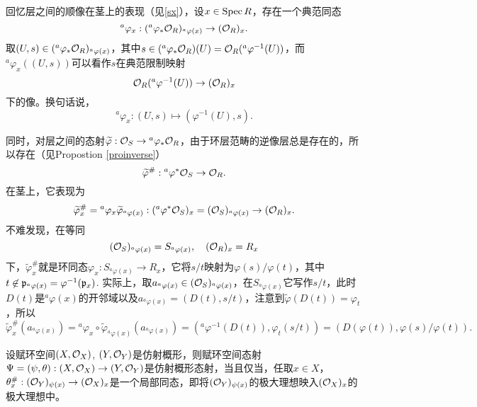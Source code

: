 \begin{para}
回忆层之间的顺像在茎上的表现（见\ref{sx}），设$x\in \operatorname{Spec} R$，存在一个典范同态
\[
	{}^a\varphi_x:({}^a\varphi_*\mathcal{O}_R)_{{}^a\varphi(x)}\to (\mathcal{O}_R)_{x}.
\]
取$(U,s)\in ({}^a\varphi_*\mathcal{O}_R)_{{}^a\varphi(x)}$，其中$s\in ({}^a\varphi_*\mathcal{O}_R)(U)=\mathcal{O}_R({}^a\varphi^{-1}(U))$，而${}^a\varphi_x((U,s))$可以看作$s$在典范限制映射
\[
	\mathcal{O}_R({}^a\varphi^{-1}(U))\to (\mathcal{O}_R)_x
\]
下的像。换句话说，
\[
	{}^a\varphi_x:(U,s)\mapsto (\varphi^{-1}(U),s).
\]

同时，对层之间的态射$\widetilde{\varphi}:\mathcal{O}_S\to {}^a\varphi_*\mathcal{O}_R$，由于环层范畴的逆像层总是存在的，所以存在（见Propostion \ref{proinverse}）
\[
	\widetilde{\varphi}^\#:{}^a\varphi^*\mathcal{O}_S\to \mathcal{O}_R.
\]
在茎上，它表现为
\[
	\widetilde{\varphi}^\#_x={}^a\varphi_x \widetilde{\varphi}_{{}^a\varphi(x)}:({}^a\varphi^*\mathcal{O}_S)_x=(\mathcal{O}_S)_{{}^a\varphi(x)}\to (\mathcal{O}_R)_x.
\]
不难发现，在等同
\[
	(\mathcal{O}_S)_{{}^a\varphi(x)}=S_{{}^a\varphi(x)},\quad (\mathcal{O}_R)_x=R_x
\]
下，$\widetilde{\varphi}^\#_x$就是环同态$\varphi_x:S_{{}^a\varphi(x)}\to R_x$，它将$s/t$映射为$\varphi(s)/\varphi(t)$，其中$t\not\in \mathfrak{p}_{{}^a\varphi(x)}=\varphi^{-1}(\mathfrak{p}_x)$. 实际上，取$a_{{}^a\varphi(x)}\in (\mathcal{O}_S)_{{}^a\varphi(x)}$，在$S_{{}^a\varphi(x)}$它写作$s/t$，此时$D(t)$是${}^a\varphi(x)$的开邻域以及$a_{{}^a\varphi(x)}=(D(t),s/t)$，注意到$\widetilde{\varphi}(D(t))=\varphi_t$，所以
\[
	\widetilde{\varphi}^\#_x(a_{{}^a\varphi(x)})={}^a\varphi_x \circ \widetilde{\varphi}_{{}^a\varphi(x)}(a_{{}^a\varphi(x)})=({}^a\varphi^{-1}(D(t)),\varphi_t(s/t))=(D(\varphi(t)),\varphi(s)/\varphi(t)).
\]
\end{para}

\begin{pro}
设赋环空间$(X,\mathcal{O}_X)$, $(Y,\mathcal{O}_Y)$是仿射概形，则赋环空间态射$\Psi=(\psi,\theta):(X,\mathcal{O}_X)\to (Y,\mathcal{O}_Y)$是仿射概形态射，当且仅当，任取$x\in X$，$\theta_x^\#:(\mathcal{O}_Y)_{\psi(x)}\to (\mathcal{O}_X)_x$是一个局部同态，即将$(\mathcal{O}_Y)_{\psi(x)}$的极大理想映入$(\mathcal{O}_X)_x$的极大理想中。
\end{pro}

